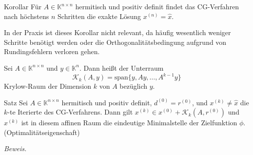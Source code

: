 \documentclass{article}
\begin{document}
\begin{thmbox}{Korollar}
    Für $A\in\mathbb{K}^{n\times n}$ hermitisch und positiv definit findet das CG-Verfahren nach 
    höchstens $n$ Schritten die exakte Lösung $x^{(n)}=\hat{x}$.
\end{thmbox}
In der Praxis ist dieses Korollar nicht relevant, da häufig wesentlich weniger Schritte benötigt werden oder die 
Orthogonalitätsbedingung aufgrund von Rundingsfehlern verloren gehen.
\begin{defbox}
    Sei $A\in\mathbb{K}^{n\times n}$ und $y\in\mathbb{K}^n$. Dann heißt der Unterraum 
    \[\mathcal{K}_k(A,y)=\text{span}\{y,Ay,\dotsc,A^{k-1}y\}\] 
    Krylow-Raum der Dimension $k$ von $A$ bezüglich $y$.
\end{defbox}
\begin{thmbox}{Satz}
    Sei $A\in\mathbb{K}^{n\times n}$ hermitisch und positiv definit, $d^{(0)}=r^{(0)}$, und $x^{(k)}\neq \hat{x}$ 
    die $k$-te Iterierte des CG-Verfahrens. Dann gilt $x^{(k)}\in x^{(0)} + \mathcal{K}_k(A,r^{(0)})$ und $x^{(k)}$ ist 
    in diesem affinen Raum die eindeutige Minimalstelle der Zielfunktion $\phi$. (Optimalitätseigenschaft)
\end{thmbox}
\textit{Beweis.} 
\end{document}
